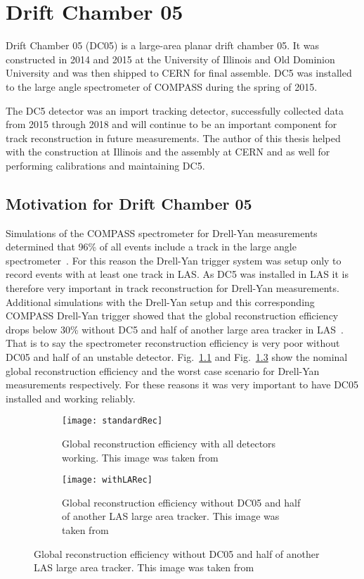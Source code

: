 \chapter{Drift Chamber 05} \label{ch::DC05}
\ifpdf
\graphicspath{{Chapters/DC5/Figs/Raster/}{Chapters/DC5/Figs/PDF/}{Chapters/DC5/Figs/}}
\else \graphicspath{{Chapters/DC5/Figs/Vector/}{Chapters/DC5/Figs/}}
\fi

Drift Chamber 05 (DC05) is a large-area planar drift chamber 05.  It was
constructed in 2014 and 2015 at the University of Illinois and Old Dominion
University and was then shipped to CERN for final assemble.  DC5 was installed
to the large angle spectrometer of COMPASS during the spring of 2015.

The DC5 detector was an import tracking detector, successfully collected data
from 2015 through 2018 and will continue to be an important component for track
reconstruction in future measurements.  The author of this thesis helped with
the construction at Illinois and the assembly at CERN and as well for performing
calibrations and maintaining DC5.

\section{Motivation for Drift Chamber 05}
Simulations of the COMPASS spectrometer for Drell-Yan measurements determined
that 96\% of all events include a track in the large angle
spectrometer~\cite{proposal}.  For this reason the Drell-Yan trigger system was
setup only to record events with at least one track in LAS.  As DC5 was
installed in LAS it is therefore very important in track reconstruction for
Drell-Yan measurements.  Additional simulations with the Drell-Yan setup and
this corresponding COMPASS Drell-Yan trigger showed that the global
reconstruction efficiency drops below 30\% without DC5 and half of another large
area tracker in LAS~\cite{quintans_rec_march12}.  That is to say the
spectrometer reconstruction efficiency is very poor without DC05 and half of an
unstable detector.  Fig.~\ref{fig::standardRec} and Fig.~\ref{fig::withLARec}
show the nominal global reconstruction efficiency and the worst case scenario
for Drell-Yan measurements respectively.  For these reasons it was very
important to have DC05 installed and working reliably.

\begin{figure}[h!t]
  \centering
  \begin{subfigure}{.5\textwidth}
    \centering \texttt{[image: standardRec]}
    \caption{Global reconstruction efficiency with all detectors working.  This
      image was taken from~\cite{quintans_rec_march28}}
    \label{fig::standardRec}
  \end{subfigure}%
  \begin{subfigure}{.5\textwidth}
    \centering
    \texttt{[image: withLARec]}
    \caption{Global reconstruction efficiency without DC05 and half of another
      LAS large area tracker.  This image was taken
      from~\cite{quintans_rec_march28}}
    \label{fig::withLARec}
  \end{subfigure}
\end{figure}

